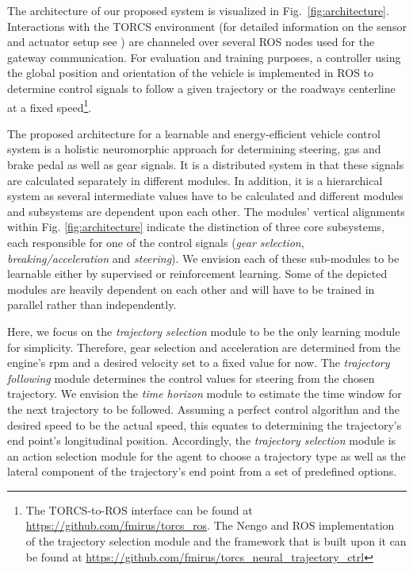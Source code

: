 The architecture of our proposed system is visualized in Fig.~\ref{fig:architecture}.
Interactions with the \ac{TORCS} environment (for detailed information on the sensor and actuator setup see \cite{Loiacono2010}) are channeled over several \ac{ROS} nodes used for the gateway communication.
For evaluation and training purposes, a controller using the global position and orientation of the vehicle is implemented in \ac{ROS} to determine control signals to follow a given trajectory or the roadways centerline at a fixed speed\footnote{The \ac{TORCS}-to-\ac{ROS} interface can be found at \url{https://github.com/fmirus/torcs_ros}.
The Nengo and \ac{ROS} implementation of the trajectory selection module and the framework that is built upon it can be found at \url{https://github.com/fmirus/torcs_neural_trajectory_ctrl}}.\par

The proposed architecture for a learnable and energy-efficient vehicle control system is a holistic neuromorphic approach for determining steering, gas and brake pedal as well as gear signals.
It is a distributed system in that these signals are calculated separately in different modules.
In addition, it is a hierarchical system as several intermediate values have to be calculated and different modules and subsystems are dependent upon each other.
The modules' vertical alignments within Fig. \ref{fig:architecture} indicate the distinction of three core subsystems, each responsible for one of the control signals (\emph{gear selection}, \emph{breaking/acceleration} and \emph{steering}).
We envision each of these sub-modules to be learnable either by supervised or reinforcement learning.
Some of the depicted modules are heavily dependent on each other and will have to be trained in parallel rather than independently. 

Here, we focus on the \emph{trajectory selection} module to be the only learning module for simplicity.
Therefore, gear selection and acceleration are determined from the engine's rpm and a desired velocity set to a fixed value for now.
The \emph{trajectory following} module determines the control values for steering from the chosen trajectory.
We envision the \emph{time horizon} module to estimate the time window for the next trajectory to be followed.
Assuming a perfect control algorithm and the desired speed to be the actual speed, this equates to determining the trajectory's end point's longitudinal position.
Accordingly, the \emph{trajectory selection} module is an action selection module for the agent to choose a trajectory type as well as the lateral component of the trajectory's end point from a set of predefined options.

